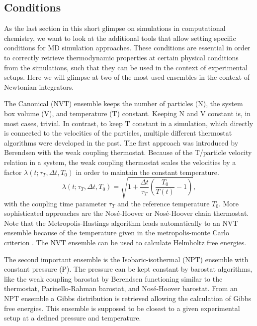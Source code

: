  
\subsection{Conditions}
As the last section in this short glimpse on simulations in computational chemistry, we want to look at the additional tools that allow setting specific conditions for MD simulation approaches. 
These conditions are essential in order to correctly retrieve thermodynamic properties at certain physical conditions from the simulations, such that they can be used in the context of experimental setups. Here we will glimpse at two of the most used ensembles in the context of Newtonian integrators.

The Canonical (NVT) ensemble keeps the number of particles (N), the system box volume (V), and temperature (T) constant. Keeping N and V constant is, in most cases, trivial. In contrast, to keep T constant in a simulation, which directly is connected to the velocities of the particles,  multiple different thermostat algorithms were developed in the past. The first approach was introduced by Berendsen\cite{Berendsen1984} with the weak coupling thermostat. Because of the T/particle velocity relation in a system, the weak coupling thermostat scales the velocities by a factor $\lambda(t; \tau_T, \Delta t, T_0)$ in order to maintain the constant temperature.  
\begin{equation}
    \lambda(t; \tau_T, \Delta t, T_0) = \sqrt{1 + \frac{\Delta t}{\tau_{T}} \left( \frac{T_0}{T(t)}-1 \right) },
\end{equation}
with the coupling time parameter  $\tau_{T}$ and the reference temperature $T_{0}$.\cite{Berendsen1984}
More sophisticated approaches are the Nos\'e-Hoover\cite{Nose1984, Nose1984A, Hoover1985} or Nos\'e-Hoover chain\cite{Martyna1992} thermostat. Note that the Metropolis-Hastings algorithm leads automatically to an NVT ensemble because of the temperature given in the metropolis-monte Carlo criterion \cite{Hastings1970}. The NVT ensemble can be used to calculate Helmholtz free energies\cite{Helmholtz1882}.

The second important ensemble is the Isobaric-isothermal (NPT) ensemble with constant pressure (P). The pressure can be kept constant by barostat algorithms, like the weak coupling barostat by Berendsen\cite{Berendsen1984} functioning similar to the thermostat, Parinello-Rahman barostat\cite{Parrinello1981}, and Nos\'e-Hoover barostat\cite{Nose1983}. From an NPT ensemble a Gibbs distribution is retrieved allowing the calculation of Gibbs free energies\cite{Gibbs1879}. This ensemble is supposed to be closest to a given experimental setup at a defined pressure and temperature.

